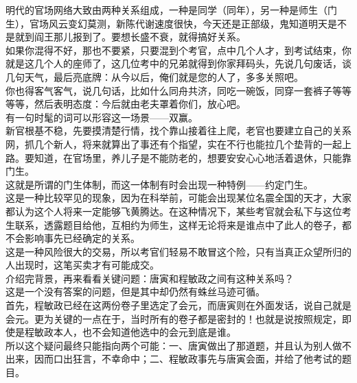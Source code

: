 \begin{multicols}{\theparacolNo}
明代的官场网络大致由两种关系组成，一种是同学（同年），另一种是师生（门生），官场风云变幻莫测，新陈代谢速度很快，今天还是正部级，鬼知道明天是不是就到阎王那儿报到了。要想长盛不衰，就得搞好关系。\\

如果你混得不好，那也不要紧，只要混到个考官，点中几个人才，到考试结束，你就是这几个人的座师了，这几位考中的兄弟就得到你家拜码头，先说几句废话，谈几句天气，最后亮底牌：从今以后，俺们就是您的人了，多多关照吧。\\

你也得客气客气，说几句话，比如什么同舟共济，同吃一碗饭，同穿一套裤子等等等等，然后表明态度：今后就由老夫罩着你们，放心吧。\\

有一句时髦的词可以形容这一场景——双赢。\\

新官根基不稳，先要摸清楚行情，找个靠山接着往上爬，老官也要建立自己的关系网，抓几个新人，将来就算出了事还有个指望，实在不行也能拉几个垫背的一起上路。要知道，在官场里，养儿子是不能防老的，想要安安心心地活着退休，只能靠门生。\\

这就是所谓的门生体制，而这一体制有时会出现一种特例——约定门生。\\

这是一种比较罕见的现象，因为在科举前，可能会出现某位名震全国的天才，大家都认为这个人将来一定能够飞黄腾达。在这种情况下，某些考官就会私下与这位考生联系，透露题目给他，互相约为师生，这样无论将来是谁点中了此人的卷子，都不会影响事先已经确定的关系。\\

这是一种风险很大的交易，所以考官们轻易不敢冒这个险，只有当真正众望所归的人出现时，这笔买卖才有可能成交。\\

介绍完背景，再来看看关键问题：唐寅和程敏政之间有这种关系吗？\\

这是一个没有答案的问题，但是其中却仍然有蛛丝马迹可循。\\

首先，程敏政已经在这两份卷子里选定了会元，而唐寅则在外面发话，说自己就是会元。更为关键的一点在于，当时所有的卷子都是密封的！也就是说按照规定，即使是程敏政本人，也不会知道他选中的会元到底是谁。\\

所以这个疑问最终只能指向两个可能：一、唐寅做出了那道题，并且认为别人做不出来，因而口出狂言，不幸命中；二、程敏政事先与唐寅会面，并给了他考试的题目。\\


\end{multicols}
